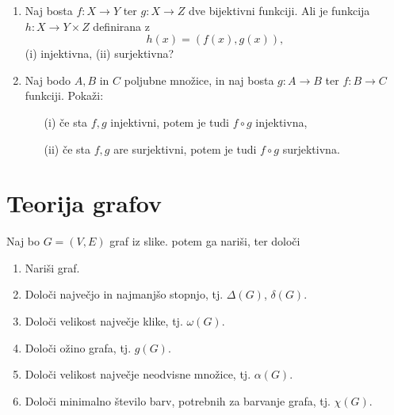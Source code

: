 \documentclass[11pt,paper=b5,footinclude,headinclude]{scrbook} %
\newtheorem{ex}{Vaja\hypertarget{sol:\theex}}[chapter]
\begin{document}
\begin{enumerate}
\item Naj bosta $f\colon X \to Y$ ter $g\colon X\to Z$ dve bijektivni funkciji. Ali je funkcija  $h\colon X \to Y \times Z$ definirana z 
$$h(x) = (f(x),g(x)),$$
(i) injektivna, (ii) surjektivna?
\item Naj bodo $A, B$ in $C$ poljubne množice,
 in naj bosta $g\colon A\to B$ ter $f\colon B\to C$  funkciji. Pokaži:
\begin{enumerate}
\item[(i)] če sta $f, g$  injektivni, potem je tudi $f\circ g$  injektivna,
\item[(ii)] če sta $f, g$ are surjektivni, potem je tudi $f\circ g$  surjektivna.
\end{enumerate}



\end{enumerate}




\section{Teorija grafov}
\begin{ex}
    Naj bo $G=(V,E)$ graf iz slike. potem ga nariši, ter določi
	\begin{enumerate}
    \item Nariši graf.
		\item Določi največjo in najmanjšo stopnjo, tj. $\Delta(G)$, $\delta(G)$.
		\item Določi velikost največje klike, tj. $\omega(G)$.
		\item Določi ožino grafa, tj. $g(G)$.
		\item Določi velikost največje neodvisne množice, tj. $\alpha(G)$.
		\item Določi minimalno število barv, potrebnih za barvanje grafa, tj. $\chi(G)$.
	\end{enumerate}

\end{ex}
\end{document}
